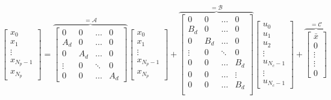\documentclass[a4paper,12pt,fleqn]{book}
\newcommand{\Np}{{N_p}}
\newcommand{\Nc}{{N_c}}
\begin{document}
\begin{equation}
\begin{bmatrix}
x_0\\
x_1\\
\vdots\\
x_{\Np-1}\\
x_{\Np}
\end{bmatrix}=
\overbrace{
\begin{bmatrix}
 0      &0      &\dots  &0\\
 A_d    &0      &\dots  & 0\\
 0      &A_d    &\dots  &0\\
 \vdots &0      &\ddots & 0\\
 0      &0      &\dots  &A_d
\end{bmatrix}
}^{=\mathcal{A}}
\begin{bmatrix}
x_0\\
x_1\\
\vdots\\
x_{\Np-1}\\
x_{\Np} 
\end{bmatrix} +
\overbrace{
\begin{bmatrix}
 0      &0      &\dots  &0\\
 B_d    &0      &\dots  & 0\\
 0      &B_d    &\dots  &0\\
 \vdots &0      &\ddots & 0\\
 0      &0      &\dots  &B_d\\
 0      &0      &\dots  &\vdots\\
 0      &0      &\dots  &B_d\\
\end{bmatrix}
}^{=\mathcal B}
\begin{bmatrix}
u_0\\
u_1\\
u_2\\
\vdots\\
u_{\Nc-1}\\
\vdots\\
u_{\Nc-1}
\end{bmatrix} +
\overbrace{
\begin{bmatrix}
\bar x\\
0\\
\vdots\\
\vdots \\
0 
\end{bmatrix}
}^{=\mathcal{C}}
\end{equation}
\end{document}
